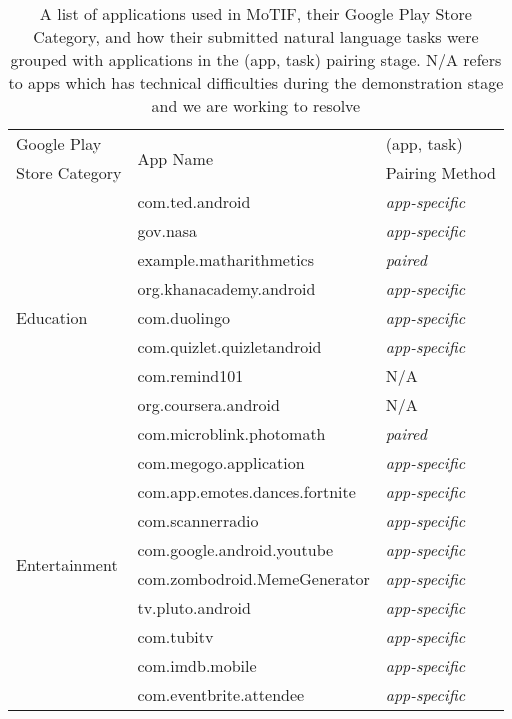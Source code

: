 \begin{table}
    \centering
        \caption{A list of applications used in MoTIF, their Google Play Store Category, and how their submitted natural language tasks were grouped with applications in the (app, task) pairing stage. N/A refers to apps which has technical difficulties during the demonstration stage and we are working to resolve}
    \begin{tabular}{|l|l|l|}
    \hline
         Google Play & \multirow{2}{*}{App Name} & (app, task) \\
         Store Category &  & Pairing Method \\
         \hline
         \multirow{9}{*}{Education} & com.ted.android & \textit{app-specific}\\
        \cline{2-3}
      &  gov.nasa & \textit{app-specific}\\ \cline{2-3}
       & example.matharithmetics & \textit{paired}\\ \cline{2-3}
       & org.khanacademy.android  & \textit{app-specific}\\ \cline{2-3}
      & com.duolingo  & \textit{app-specific} \\ \cline{2-3}
       & com.quizlet.quizletandroid & \textit{app-specific}\\ \cline{2-3}
       & com.remind101 & N/A \\ \cline{2-3}
       & org.coursera.android& N/A \\ \cline{2-3}
       & com.microblink.photomath & \textit{paired} \\ \hline
        \multirow{8}{*}{Entertainment} & com.megogo.application & \textit{app-specific} \\ \cline{2-3}
      &  com.app.emotes.dances.fortnite & \textit{app-specific}\\ \cline{2-3}
      &  com.scannerradio & \textit{app-specific}\\ \cline{2-3}
       & com.google.android.youtube & \textit{app-specific} \\ \cline{2-3}
       & com.zombodroid.MemeGenerator &\textit{app-specific} \\ \cline{2-3}
       & tv.pluto.android &\textit{app-specific} \\\cline{2-3}
       & com.tubitv & \textit{app-specific}\\\cline{2-3}
        & com.imdb.mobile & \textit{app-specific}\\\cline{2-3}
        & com.eventbrite.attendee & \textit{app-specific}\\ 

\end{tabular}
\end{table}

